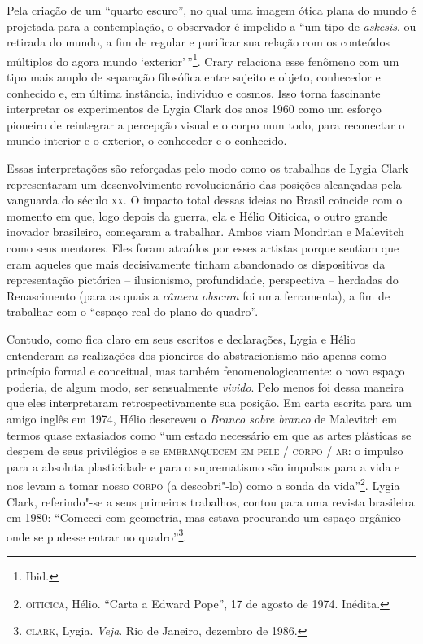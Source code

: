 \begin{multicols}{2}
Pela
criação de um ``quarto escuro'', no qual uma imagem ótica plana do mundo
é projetada para a contemplação, o observador é impelido a ``um tipo de
\textit{askesis}, ou retirada do mundo, a fim de regular e purificar sua
relação com os conteúdos múltiplos do agora mundo `exterior'\,''\footnote{Ibid.}.
Crary relaciona esse fenômeno com um tipo mais amplo de separação
filosófica entre sujeito e objeto, conhecedor e conhecido e, em última
instância, indivíduo e cosmos. Isso torna fascinante interpretar os
experimentos de Lygia Clark dos anos 1960 como um esforço pioneiro de
reintegrar a percepção visual e o corpo num todo, para reconectar o
mundo interior e o exterior, o conhecedor e o conhecido.

Essas interpretações são reforçadas pelo modo como os trabalhos de Lygia
Clark representaram um desenvolvimento revolucionário das posições
alcançadas pela vanguarda do século \textsc{xx}. O impacto total dessas ideias no
Brasil coincide com o momento em que, logo depois da guerra, ela e Hélio
Oiticica, o outro grande inovador brasileiro, começaram a trabalhar.
Ambos viam Mondrian e Malevitch como seus mentores. Eles foram atraídos
por esses artistas porque sentiam que eram aqueles que mais
decisivamente tinham abandonado os dispositivos da representação
pictórica -- ilusionismo, profundidade, perspectiva -- herdadas do
Renascimento (para as quais a \textit{câmera obscura} foi uma ferramenta),
a fim de trabalhar com o ``espaço real do plano do quadro''. 

Contudo,
como fica claro em seus escritos e declarações, Lygia e Hélio entenderam
as realizações dos pioneiros do abstracionismo não apenas como princípio
formal e conceitual, mas também fenomenologicamente: o novo espaço
poderia, de algum modo, ser sensualmente \textit{vivido}. Pelo menos foi
dessa maneira que eles interpretaram retrospectivamente sua posição. Em
carta escrita para um amigo inglês em 1974, Hélio descreveu o
\textit{Branco sobre branco} de Malevitch em termos quase extasiados como
``um estado necessário em que as artes plásticas se despem de seus
privilégios e se \textsc{embranquecem em pele / corpo / ar}: o impulso para a
absoluta plasticidade e para o suprematismo são impulsos para a vida e
nos levam a tomar nosso \textsc{corpo} (a descobri"-lo) como a sonda da
vida''\footnote{\textsc{oiticica}, Hélio. ``Carta a Edward Pope'', 17 de agosto de
  1974. Inédita.}. Lygia Clark, referindo"-se a seus primeiros trabalhos,
contou para uma revista brasileira em 1980: ``Comecei com geometria, mas
estava procurando um espaço orgânico onde se pudesse entrar no
quadro''\footnote{\textsc{clark}, Lygia. \textit{Veja}. Rio de Janeiro, dezembro de
  1986.}.


\end{multicols}
